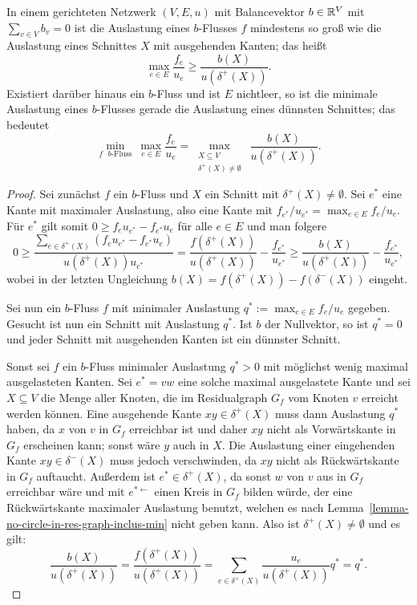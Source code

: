 \begin{theorem}\label{thm-strong-duality-sparsest-cut-min-flow}
	In einem gerichteten Netzwerk $(V, E, u)$ mit Balancevektor $b\in\mathbb{R}^V$ mit $\sum_{v\in V}b_v = 0$ ist die Auslastung eines $b$-Flusses $f$ mindestens so groß wie die Auslastung eines Schnittes $X$ mit ausgehenden Kanten; das heißt \[\max_{e\in E} \frac{f_e}{u_e} \geq \frac{b(X)}{u(\delta^+(X))}.\]
	Existiert darüber hinaus ein $b$-Fluss und ist $E$ nichtleer, so ist die minimale Auslastung eines $b$-Flusses gerade die Auslastung eines dünnsten Schnittes; das bedeutet
	\[
		\min_{\text{$f$ $b$-Fluss}}~\max_{e\in E}\frac{f_e}{u_e} = \max_{\substack{X\subseteq V\\ \delta^+(X)\neq\emptyset}} ~ \frac{b(X)}{u(\delta^+(X))}.
	\]
\end{theorem}
\begin{proof}
	Sei zunächst $f$ ein $b$-Fluss und $X$ ein Schnitt mit $\delta^+(X)\neq\emptyset$.
	Sei $e^*$ eine Kante mit maximaler Auslastung, also eine Kante mit $f_{e^*}/u_{e^*}=\max_{e\in E} f_e / u_e$.
	Für $e^*$ gilt somit $0\geq f_e u_{e^*} - f_{e^*}u_e$ für alle $e\in E$ und man folgere
	\[
		0\geq \frac{\sum_{e\in \delta^+(X)}(f_e u_{e^*} - f_{e^*}u_e)}{u(\delta^+(X)) u_{e^*}} = \frac{f(\delta^+(X))}{u(\delta^+(X))} - \frac{f_{e^*}}{u_{e^*}} \geq \frac{b(X)}{u(\delta^+(X))} - \frac{f_{e^*}}{u_{e^*}},
	\]
	wobei in der letzten Ungleichung $b(X) = f(\delta^+(X)) - f(\delta^-(X))$ eingeht.
	
	Sei nun ein $b$-Fluss $f$ mit minimaler Auslastung $q^*:=\max_{e\in E} f_e/u_e$ gegeben.
	Gesucht ist nun ein Schnitt mit Auslastung $q^*$.
	Ist $b$ der Nullvektor, so ist $q^*=0$ und jeder Schnitt mit ausgehenden Kanten ist ein dünnster Schnitt.
	
	Sonst sei $f$ ein $b$-Fluss minimaler Auslastung $q^* > 0$ mit möglichst wenig maximal ausgelasteten Kanten.
	Sei $e^*=vw$ eine solche maximal ausgelastete Kante und sei $X\subseteq V$ die Menge aller Knoten, die im Residualgraph $G_f$ vom Knoten $v$ erreicht werden können.
	Eine ausgehende Kante $xy\in\delta^+(X)$ muss dann Auslastung $q^*$ haben, da $x$ von $v$ in $G_f$ erreichbar ist und daher $xy$ nicht als Vorwärtskante in $G_f$ erscheinen kann; sonst wäre $y$ auch in $X$.
	Die Auslastung einer eingehenden Kante $xy\in\delta^-(X)$ muss jedoch verschwinden, da $xy$ nicht als Rückwärtskante in $G_f$ auftaucht.
	Außerdem ist $e^*\in \delta^+(X)$, da sonst $w$ von $v$ aus in $G_f$ erreichbar wäre und mit $e^{*\leftarrow}$ einen Kreis in $G_f$ bilden würde, der eine Rückwärtskante maximaler Auslastung benutzt, welchen es nach Lemma~\ref{lemma-no-circle-in-res-graph-inclus-min} nicht geben kann.
	Also ist $\delta^+(X)\neq \emptyset$ und es gilt:
	\[
		\frac{b(X)}{u(\delta^+(X))} = \frac{f(\delta^+(X))}{u(\delta^+(X))} = \sum_{e\in\delta^+(X)} \frac{u_e}{u(\delta^+(X))} q^* = q^*.
	\]
\end{proof}


